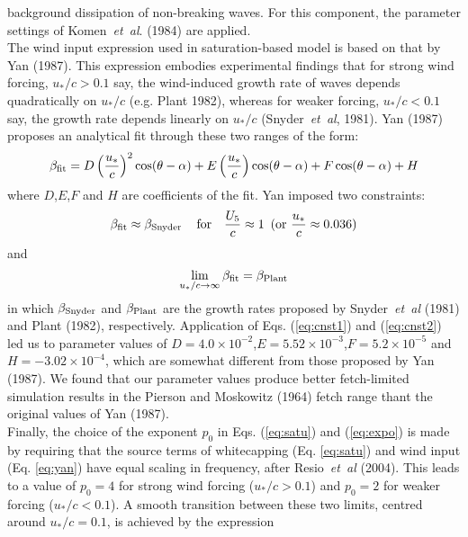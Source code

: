 \documentclass[12pt]{book}
\begin{document}
background dissipation of non-breaking waves. For this component, the parameter settings of Komen~{\it et~al}. (1984)
are applied.
\\[2ex]
\noindent
The wind input expression used in saturation-based model is based on that by Yan (1987). This expression embodies experimental
findings that for strong wind forcing, $u_*/c > 0.1$ say, the wind-induced growth rate of waves depends quadratically on
$u_*/c$ (e.g. Plant 1982), whereas for weaker forcing, $u_*/c < 0.1$ say, the growth rate depends linearly on $u_*/c$
(Snyder~{\it et~al}, 1981). Yan (1987) proposes an analytical fit through these two ranges of the form:
\begin{equation}
  \beta_{\rm fit} = D \left( \frac{u_*}{c} \right)^2 \cos(\theta-\alpha) + E \left( \frac{u_*}{c} \right) \cos(\theta-\alpha) +
                    F \cos(\theta-\alpha) + H
  \label{eq:yan}
\end{equation}
where $D$,$E$,$F$ and $H$ are coefficients of the fit. Yan imposed two constraints:
\begin{equation}
  \beta_{\rm fit} \approx \beta_{\rm Snyder}\, \quad \mbox{for} \quad \frac{U_5}{c} \approx 1\,\,\, (\mbox{or} \,\, \frac{u_*}{c} \approx 0.036)
  \label{eq:cnst1}
\end{equation}
and
\begin{equation}
  \lim \limits_{u_*/c \rightarrow \infty} \beta_{\rm fit} = \beta_{\rm Plant}
  \label{eq:cnst2}
\end{equation}
in which $\beta_{\rm Snyder}$ and $\beta_{\rm Plant}$ are the growth rates proposed by Snyder~{\it et~al} (1981) and Plant (1982), respectively.
Application of Eqs. (\ref{eq:cnst1}) and (\ref{eq:cnst2}) led us to parameter values of $D=4.0 \times 10^{-2}$,$E=5.52 \times 10^{-3}$,$F=5.2 \times 10^{-5}$
and $H=-3.02 \times 10^{-4}$, which are somewhat different from those proposed by Yan (1987). We found that our parameter values produce better
fetch-limited simulation results in the Pierson and Moskowitz (1964) fetch range thant the original values of Yan (1987).
\\[2ex]
\noindent
Finally, the choice of the exponent $p_0$ in Eqs. (\ref{eq:satu}) and (\ref{eq:expo}) is made by requiring that the source terms of whitecapping
(Eq. \ref{eq:satu}) and wind input (Eq. \ref{eq:yan}) have equal scaling in frequency, after Resio~{\it et~al} (2004). This leads to a value of
$p_0 = 4$ for strong wind forcing ($u_*/c > 0.1$) and $p_0 = 2$ for weaker forcing ($u_*/c < 0.1$). A smooth transition between these two limits,
centred around $u_*/c = 0.1$, is achieved by the expression
\end{document}
